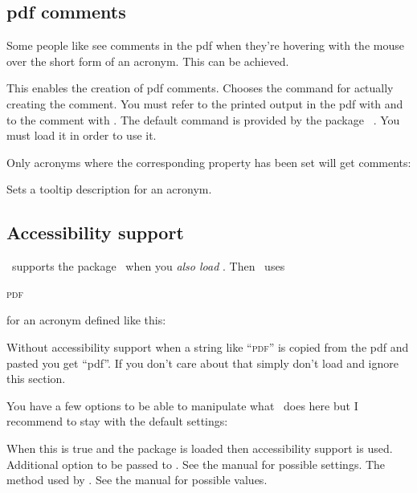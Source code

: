 \documentclass{acro-manual}
\begin{document}
\subsection{\acs*{pdf} comments}\label{sec:pdf-comments}
Some people like see comments in the \ac{pdf} when they're hovering with the
mouse over the short form of an acronym.  This can be achieved.
\begin{options}
    This enables the creation of \ac{pdf} comments.
    Chooses the command for actually creating the comment.  You must refer to
    the printed output in the \ac{pdf} with  and to the comment with
    .  The default command  is provided by the
    package ~\cite{pkg:pdfcomment}.  You must load it in order
    to use it.
\end{options}
Only acronyms where the corresponding property has been set will get comments:  
\begin{properties}
    Sets a tooltip description for an acronym.
\end{properties}

\subsection{Accessibility support}\label{sec:access-supp}
\acro\ supports the  package~\cite{pkg:accsupp} when you
\emph{also load }.  Then \acro\ uses
\begin{sourcecode}
    \textsc{pdf}%
  \EndAccSupp{}%
\end{sourcecode}
for an acronym defined like this:
\begin{sourcecode}
\end{sourcecode}
Without accessibility support when a string like \enquote{\textsc{pdf}} is
copied from the \ac{pdf} and pasted you get \enquote{pdf}.  If you don't care
about that simply don't load  and ignore this section.

You have a few options to be able to manipulate what \acro\ does here but I
recommend to stay with the default settings:
\begin{options}
    When this is true and the package  is loaded then
    accessibility support is used.
   \Initial
    Additional option to be passed to .  See the
     manual for possible settings.
    The method used by .  See the
     manual for possible values.
\end{options}
\end{document}
